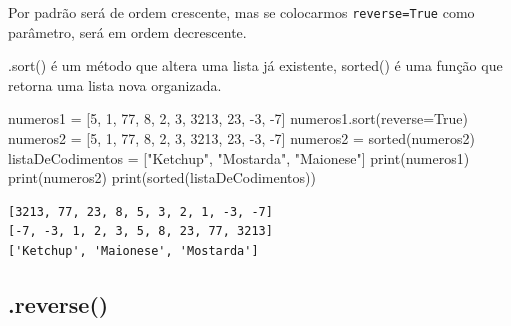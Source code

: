 \documentclass[
  letterpaper,
  DIV=11,
  numbers=noendperiod]{scrreprt}
\newenvironment{Shaded}{\begin{snugshade}}{\end{snugshade}}
\newcommand{\BuiltInTok}[1]{\textcolor[rgb]{0.00,0.23,0.31}{#1}}
\newcommand{\DecValTok}[1]{\textcolor[rgb]{0.68,0.00,0.00}{#1}}
\newcommand{\NormalTok}[1]{\textcolor[rgb]{0.00,0.23,0.31}{#1}}
\newcommand{\OperatorTok}[1]{\textcolor[rgb]{0.37,0.37,0.37}{#1}}
\newcommand{\StringTok}[1]{\textcolor[rgb]{0.13,0.47,0.30}{#1}}
\newcommand{\VariableTok}[1]{\textcolor[rgb]{0.07,0.07,0.07}{#1}}
\begin{document}
Por padrão será de ordem crescente, mas se colocarmos
\texttt{reverse=True} como parâmetro, será em ordem decrescente.

.sort() é um método que altera uma lista já existente, sorted() é uma
função que retorna uma lista nova organizada.

\begin{Shaded}
\begin{Highlighting}[]
\NormalTok{numeros1 }\OperatorTok{=}\NormalTok{ [}\DecValTok{5}\NormalTok{, }\DecValTok{1}\NormalTok{, }\DecValTok{77}\NormalTok{, }\DecValTok{8}\NormalTok{, }\DecValTok{2}\NormalTok{, }\DecValTok{3}\NormalTok{, }\DecValTok{3213}\NormalTok{, }\DecValTok{23}\NormalTok{, }\OperatorTok{{-}}\DecValTok{3}\NormalTok{, }\OperatorTok{{-}}\DecValTok{7}\NormalTok{]}
\NormalTok{numeros1.sort(reverse}\OperatorTok{=}\VariableTok{True}\NormalTok{)}
\NormalTok{numeros2 }\OperatorTok{=}\NormalTok{ [}\DecValTok{5}\NormalTok{, }\DecValTok{1}\NormalTok{, }\DecValTok{77}\NormalTok{, }\DecValTok{8}\NormalTok{, }\DecValTok{2}\NormalTok{, }\DecValTok{3}\NormalTok{, }\DecValTok{3213}\NormalTok{, }\DecValTok{23}\NormalTok{, }\OperatorTok{{-}}\DecValTok{3}\NormalTok{, }\OperatorTok{{-}}\DecValTok{7}\NormalTok{]}
\NormalTok{numeros2 }\OperatorTok{=} \BuiltInTok{sorted}\NormalTok{(numeros2)}
\NormalTok{listaDeCodimentos }\OperatorTok{=}\NormalTok{ [}\StringTok{"Ketchup"}\NormalTok{, }\StringTok{"Mostarda"}\NormalTok{, }\StringTok{"Maionese"}\NormalTok{]}
\BuiltInTok{print}\NormalTok{(numeros1)}
\BuiltInTok{print}\NormalTok{(numeros2)}
\BuiltInTok{print}\NormalTok{(}\BuiltInTok{sorted}\NormalTok{(listaDeCodimentos))}
\end{Highlighting}
\end{Shaded}

\begin{tcolorbox}[enhanced jigsaw, breakable, leftrule=.75mm, left=2mm, opacityback=0, bottomrule=.15mm, toprule=.15mm, rightrule=.15mm, arc=.35mm, colback=white]

\begin{verbatim}
[3213, 77, 23, 8, 5, 3, 2, 1, -3, -7]
[-7, -3, 1, 2, 3, 5, 8, 23, 77, 3213]
['Ketchup', 'Maionese', 'Mostarda']
\end{verbatim}

\end{tcolorbox}

\hypertarget{reverse}{%
\subsection{.reverse()}\label{reverse}}
\end{document}
